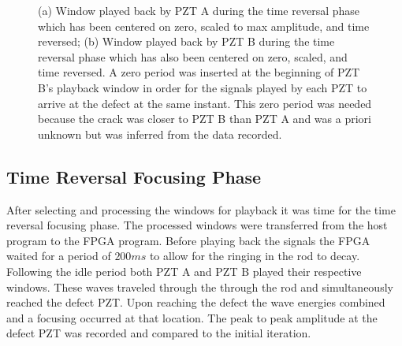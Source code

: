\begin{figure}
\begin{subfigmatrix}{2}
\end{subfigmatrix}

  \caption[all]
  { \label{fig:scaledSignals}
(a) Window played back by PZT A during the time reversal phase which has been centered on zero, scaled to max amplitude, and time reversed;
(b) Window played back by PZT B during the time reversal phase which has also been centered on zero, scaled, and time reversed. A zero period was inserted at the beginning of PZT B's playback window in order for the signals played by each PZT to arrive at the defect at the same instant. This zero period was needed because the crack was closer to PZT B than PZT A and was a priori unknown but was inferred from the data recorded.
}
\end{figure}

\subsection{Time Reversal Focusing Phase}
After selecting and processing the windows for playback it was time for the time reversal focusing phase. The processed windows were transferred from the host program to the FPGA program. Before playing back the signals the FPGA waited for a period of $200ms$ to allow for the ringing in the rod to decay. Following the idle period both PZT A and PZT B played their respective windows. These waves traveled through the through the rod and simultaneously reached the defect PZT. Upon reaching the defect the wave energies combined and a focusing occurred at that location. The peak to peak amplitude at the defect PZT was recorded and compared to the initial iteration.

